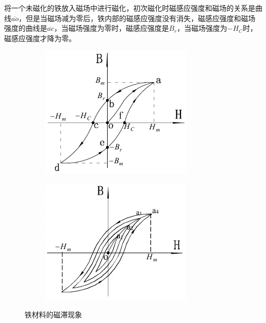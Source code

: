 \documentclass{article}
\begin{document}
将一个未磁化的铁放入磁场中进行磁化，初次磁化时磁感应强度和磁场的关系是曲线$\overline{ao}$，但是当磁场减为零后，铁内部的磁感应强度没有消失，磁感应强度和磁场强度的曲线是$\overline{ac}$，当磁场强度为零时，磁感应强度是$B_r$，当磁场强度为$-H_C$时，磁感应强度才降为零。
\begin{figure}[H]
  \centering
  \begin{subfigure}{0.48\linewidth}
    \includegraphics[width=\linewidth]{figures/磁滞现象1}
  \end{subfigure}
  \begin{subfigure}{0.48\linewidth}
    \includegraphics[width=\linewidth]{figures/磁滞现象2}
  \end{subfigure}
  \caption{铁材料的磁滞现象}
\end{figure}
\end{document}

